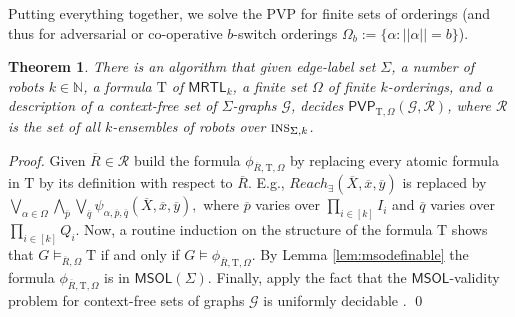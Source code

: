 \documentclass{llncs}
\newtheorem{theorem}{Theorem}
\def\MRTL{\textsf{MRTL}}
\def\gclass{\mathcal{G}}
\def\rclass{\mathcal{R}}
\def\T{\mathrm{T}}
\def\nat{\mathbb{N}}
\def\PVP{\mathsf{PVP}}
\newcommand{\tup}[1]{\overline{#1}}
\def\ins{\textsc{ins}}
\def\msol{\mathsf{MSOL}}
\begin{document}
Putting everything together, we solve the PVP for finite sets of orderings (and thus for adversarial or co-operative $b$-switch orderings $\Omega_b := \{\alpha : ||\alpha|| = b\}$).

\begin{theorem} \label{thm:PVPdec}
There is an algorithm that given edge-label set $\Sigma$, a number of robots $k \in \nat$, a formula $\T$ of $\MRTL_k$, a finite set $\Omega$ of finite $k$-orderings, and a description of a context-free set of $\Sigma$-graphs $\gclass$, decides $\PVP_{\T,\Omega}(\gclass,\rclass)$, where  $\rclass$ is the set of all $k$-ensembles of robots over $\ins_{\Sigma,k}$.
\end{theorem}
%
\begin{proof}
Given $\tup{R} \in \rclass$ build the formula $\phi_{\tup{R},\T,\Omega}$ by replacing every atomic formula in
$\T$ by its definition with respect to $\tup{R}$. E.g., $Reach_\exists(\tup{X},\tup{x},\tup{y})$ is replaced by
$
\bigvee_{\alpha \in \Omega} \bigwedge_{\tup{p}} \bigvee_{\tup{q}} \psi_{\alpha,\tup{p},\tup{q}} (\tup{X},\tup{x},\tup{y}),
$
where $\tup{p}$ varies over $\prod_{i  \in [k]} I_i$ and $\tup{q}$ varies over $\prod_{i \in [k]} Q_i$.
%
Now, a routine induction on the structure of the formula $\T$ shows that $G \models_{\tup{R},\Omega} \T$ if and only if $G \models \phi_{\tup{R},\T,\Omega}$. By Lemma \ref{lem:msodefinable} the formula $\phi_{\tup{R},\T,\Omega}$ is in $\msol(\Sigma)$. Finally, apply the fact that the $\msol$-validity problem for context-free sets of graphs $\gclass$ is uniformly decidable \cite{CE12}. \qed
\end{proof}
\end{document}

